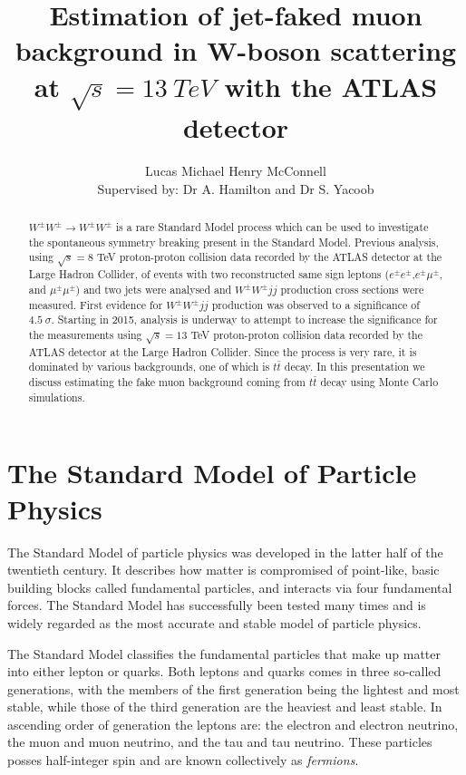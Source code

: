 \documentclass[a4paper]{jpconf}
\begin{document}
\title{Estimation of jet-faked muon background in W-boson scattering at $\sqrt{s} = 13 \ TeV$ with the ATLAS detector}
\author{Lucas Michael Henry McConnell \\ Supervised by: Dr A. Hamilton and Dr S. Yacoob}
\address{Department of Physics, University of Cape Town, South Afirca}
\begin{abstract}
$ W^{\pm}W^{\pm} \longrightarrow W^{\pm}W^{\pm}$ is a rare Standard Model process which can be used to investigate the spontaneous symmetry breaking present in the Standard Model. Previous analysis, using $\sqrt{s} = 8$ TeV proton-proton collision data recorded by the ATLAS detector at the Large Hadron Collider, of events with two reconstructed same sign leptons ($e^{\pm}e^{\pm}$,$e^{\pm}\mu^{\pm}$, and $\mu^{\pm}\mu^{\pm}$) and two jets were analysed and $W^{\pm}W^{\pm}jj$ production cross sections were measured. First evidence for $W^{\pm}W^{\pm}jj$ production was observed to a significance of $4.5 \ \sigma$. Starting in 2015, analysis is underway to attempt to increase the significance for the measurements using $\sqrt{s} = 13$ TeV proton-proton collision data recorded by the ATLAS detector at the Large Hadron Collider. Since the process is very rare, it is dominated by various backgrounds, one of which is $t\bar{t}$ decay. In this presentation we discuss estimating the fake muon background coming from $t\bar{t}$ decay using Monte Carlo simulations.
\end{abstract}
\section{The Standard Model of Particle Physics}
The Standard Model \cite{stdmd1,stdmd2,stdmd3,stdmd4} of particle physics was developed in the latter half of the twentieth century. It describes how matter is compromised of point-like, basic building blocks called fundamental particles, and interacts via four fundamental forces. The Standard Model has successfully been tested many times and is widely regarded as the most accurate and stable \cite{stdmd_fit} model of particle physics.

The Standard Model classifies the fundamental particles that make up matter into either lepton or quarks. Both leptons and quarks comes in three so-called generations, with the members of the first generation being the lightest and most stable, while those of the third generation are the heaviest and least stable. In ascending order of generation the leptons are: the electron and electron neutrino, the muon and muon neutrino, and the tau and tau neutrino. These particles posses half-integer spin and are known collectively as \emph{fermions}.
\end{document}
